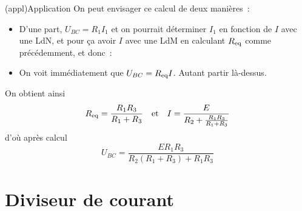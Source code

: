 \documentclass[../../main/main.tex]{subfiles}
\begin{document}
{\begin{tcbraster}[raster columns=3, raster equal height=rows]
\begin{tcb}
\begin{center}
        \end{center}
    \end{tcb}
\end{tcbraster}
\begin{center}
    \begin{tcb}[sidebyside](appl){Application}
        On peut envisager ce calcul de deux manières~:
        \begin{itemize}

            \item D'une part, $U_{BC} = R_1 I_1$ et on pourrait déterminer $I_1$
                en fonction de $I$ avec une LdN, et pour ça avoir $I$ avec une
                LdM en calculant $R_{\rm eq}$ comme précédemment, et donc~:

            \item On voit immédiatement que $U_{BC} = R_{\rm eq}I$. Autant
                partir là-dessus.
        \end{itemize}
        \tcblower
        On obtient ainsi \[ R_{\rm eq} = \frac{R_1R_3}{R_1+R_3} \quad \text{et}
        \quad I = \frac{E}{R_2 + \frac{R_1R_3}{R_1+R_3}}\] d'où après calcul
        \[\boxed{U_{BC} = \frac{ER_1R_3}{R_2(R_1+R_3)+R_1R_3}}\]
    \end{tcb}
\end{center}
}

\section{Diviseur de courant}
\end{document}
